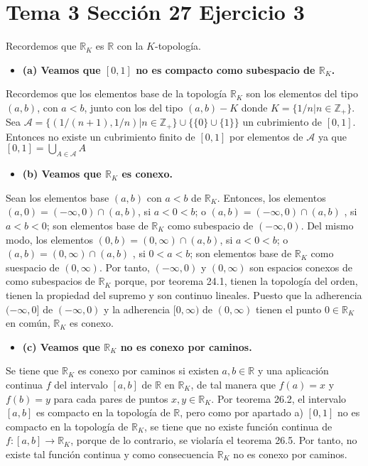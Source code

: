 \documentclass{article}
\begin{document}
\section{Tema 3 Sección 27 Ejercicio 3}
Recordemos que $\mathbb{R}_K$ es $\mathbb{R}$ con la $K$-topología.
\begin{itemize}
\item \bf (a) \rm Veamos que $[0,1]$ no es compacto como subespacio de $\mathbb{R}_K$.
\end{itemize}
Recordemos que los elementos base de la topología $\mathbb{R}_K$ son los elementos del tipo $(a,b)$, con $a<b$, junto con los del tipo $(a,b)-K$ donde $K=\{1/n|n\in \mathbb{Z}_{+}\}$. 
Sea $\mathcal{A}=\{(1/(n+1),1/n)|n\in \mathbb{Z}_+\}\cup \{\{0\}\cup \{1\}\}$ un cubrimiento de $[0,1]$. Entonces no existe un cubrimiento finito de $[0,1]$ por elementos de $\mathcal{A}$ ya que $[0,1]=\bigcup_{A\in \mathcal{A}}A$
\begin{itemize}
\item \bf (b) \rm Veamos que $\mathbb{R}_K$ es conexo.
\end{itemize}
Sean los elementos base $(a,b)$ con $a<b$ de $\mathbb{R}_K$. Entonces, los elementos $(a,0)=(-\infty,0)\cap (a,b)$, si $a<0<b$; o $(a,b)=(-\infty,0)\cap (a,b)$ , si $a<b<0$; son elementos base de $\mathbb{R}_K$ como subespacio de $(-\infty,0)$. Del mismo modo, los elementos $(0,b)=(0,\infty)\cap (a,b)$, si $a<0<b$; o $(a,b)=(0,\infty)\cap (a,b)$ , si $0<a<b$; son elementos base de $\mathbb{R}_K$ como suespacio de $(0,\infty)$. Por tanto, $(-\infty,0)$ y $(0,\infty)$ son espacios conexos de como subespacios de $\mathbb{R}_K$ porque, por teorema 24.1, tienen la topología del orden, tienen la propiedad del supremo y son continuo lineales. Puesto que la adherencia $(-\infty,0]$ de $(-\infty,0)$ y la adherencia $[0,\infty)$ de $(0,\infty)$ tienen el punto $0\in \mathbb{R}_K$ en común, $\mathbb{R}_K$ es conexo.
\begin{itemize}
\item \bf (c) \rm Veamos que $\mathbb{R}_K$ no es conexo por caminos.
\end{itemize}
Se tiene que $\mathbb{R}_K$ es conexo por caminos si existen $a,b\in\mathbb{R}$ y una aplicación continua $f$ del intervalo $[a,b]$ de $\mathbb{R}$ en $\mathbb{R}_K$, de tal manera que $f(a)=x$ y $f(b)=y$ para cada pares de puntos $x,y\in \mathbb{R}_K$. Por teorema 26.2, el intervalo $[a,b]$ es compacto en la topología de $\mathbb{R}$, pero como por apartado a) $[0,1]$ no es compacto en la topología de $\mathbb{R}_K$, se tiene que no existe función continua de $f:[a,b]\rightarrow \mathbb{R}_K$, porque de lo contrario, se violaría el teorema 26.5. Por tanto, no existe tal función continua y como consecuencia $\mathbb{R}_K$ no es conexo por caminos.
\end{document}
